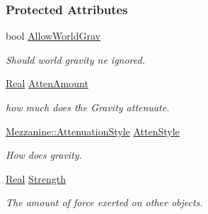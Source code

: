 \subsubsection*{Protected Attributes}
\begin{DoxyCompactItemize}
\item 
\hypertarget{classMezzanine_1_1GravityWell_a869ff5ef7c317e642e2b366e18d4f818}{
bool \hyperlink{classMezzanine_1_1GravityWell_a869ff5ef7c317e642e2b366e18d4f818}{AllowWorldGrav}}
\label{classMezzanine_1_1GravityWell_a869ff5ef7c317e642e2b366e18d4f818}

\begin{DoxyCompactList}\small\item\em Should world gravity ne ignored. \item\end{DoxyCompactList}\item 
\hypertarget{classMezzanine_1_1GravityWell_a82bf415225d76850cc832128077be947}{
\hyperlink{namespaceMezzanine_a726731b1a7df72bf3583e4a97282c6f6}{Real} \hyperlink{classMezzanine_1_1GravityWell_a82bf415225d76850cc832128077be947}{AttenAmount}}
\label{classMezzanine_1_1GravityWell_a82bf415225d76850cc832128077be947}

\begin{DoxyCompactList}\small\item\em how much does the Gravity attenuate. \item\end{DoxyCompactList}\item 
\hypertarget{classMezzanine_1_1GravityWell_ae1ceea5a9065775ea1b54e676fea9ed0}{
\hyperlink{namespaceMezzanine_a2d10a79e11a2031df10af540eede12fa}{Mezzanine::AttenuationStyle} \hyperlink{classMezzanine_1_1GravityWell_ae1ceea5a9065775ea1b54e676fea9ed0}{AttenStyle}}
\label{classMezzanine_1_1GravityWell_ae1ceea5a9065775ea1b54e676fea9ed0}

\begin{DoxyCompactList}\small\item\em How does gravity. \item\end{DoxyCompactList}\item 
\hypertarget{classMezzanine_1_1GravityWell_a2ed7c1e6618618ddd990e1466e9471c5}{
\hyperlink{namespaceMezzanine_a726731b1a7df72bf3583e4a97282c6f6}{Real} \hyperlink{classMezzanine_1_1GravityWell_a2ed7c1e6618618ddd990e1466e9471c5}{Strength}}
\label{classMezzanine_1_1GravityWell_a2ed7c1e6618618ddd990e1466e9471c5}

\begin{DoxyCompactList}\small\item\em The amount of force exerted on other objects. \item\end{DoxyCompactList}\end{DoxyCompactItemize}


